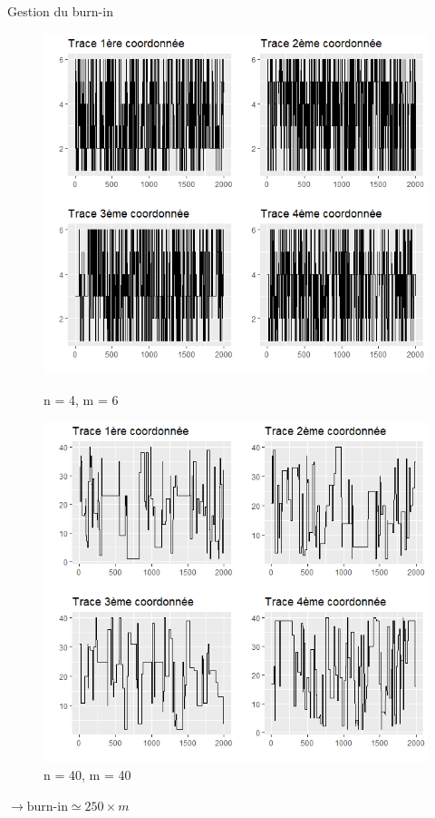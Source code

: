 \documentclass[10pt,xcolor=table,color={dvipsnames,usenames},ignorenonframetext,usepdftitle=false,french]{beamer}
\begin{document}
\begin{frame}{Gestion du burn-in}
\protect\hypertarget{gestion-du-burn-in}{}

\begin{figure}
\begin{minipage}{.5\textwidth}
\includegraphics[width=1\textwidth]{img/n_4_m_6.png}
\captionsetup{margin=0cm,format=hang,justification=justified}
\caption{n = 4, m = 6}
\end{minipage}%
\begin{minipage}{.5\textwidth}
\includegraphics[width=1\textwidth]{img/n_40_m_40.png}
\captionsetup{margin=0cm,format=hang,justification=justified}
\caption{n = 40, m = 40}
\end{minipage}
\end{figure}

\bigskip

\bigskip
\pause

\(\rightarrow\text{burn-in}\simeq250\times m\)

\end{frame}
\end{document}

